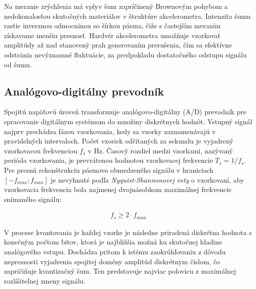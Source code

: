 Na meranie zrýchlenia má vplyv šum zapríčinený Brownovým pohybom a nedokonalosťou skutočných materiálov v štruktúre
akcelerometra. Intenzita šumu rastie inverznou odmocninou so šírkou pásma, čiže s častejším meraním získavame menšiu presnosť.
Hardvér akcelerometra umožňuje vzorkovať amplitúdy až nad stanovený prah generovaním prerušenia, čím sa efektívne odstránia
nevýznamné fluktuácie, za predpokladu dostatočného odstupu signálu od šumu.

\subsection{Analógovo-digitálny prevodník}
Spojitú napäťovú úroveň transformuje analógovo-digitálny (A/D) prevodník pre spracovanie digitálnym systémom do množiny diskrétnych
hodnôt. Vstupný signál najprv prechádza fázou vzorkovania, kedy sa vzorky zaznamenávajú v pravidelných intervaloch. Počet vzoriek
odčítaných za sekundu je vyjadrený vzorkovacou frekvenciou $f_s$ v Hz. Časový rozdiel medzi vzorkami, nazývaný perióda vzorkovania,
je prevrátenou hodnotou vzorkovacej frekvencie $T_s = 1 / f_s$. Pre presnú rekonštrukciu pásmovo obmedzeného signálu v hraniciach
$[-f_{max}; f_{max}]$ je nevyhnuté podľa \emph{Nyquist-Shannonovej vety} o vzorkovaní, aby vzorkovacia frekvencia bola najmenej
dvojnásobkom maximálnej frekvencie snímaného signálu:
\begin{ceqn}\begin{align}
   f_s \geq 2 \cdot f_{max}
\end{align}\end{ceqn}

V procese kvantovania je každej vzorke je následne priradená diskrétna hodnota s konečným počtom bitov, ktorá je najbližšia
možná ku skutočnej hladine analógového vstupu. Dochádza pritom k istému zaokrúhľovaniu z dôvodu nepresnosti vyjadrenia spojitej
domény amplitúd diskrétnym číslom, čo zapričiňuje kvantizačný šum. Ten predstavuje najviac polovicu z maximálnej rozlíšiteľnej
zmeny signálu.

